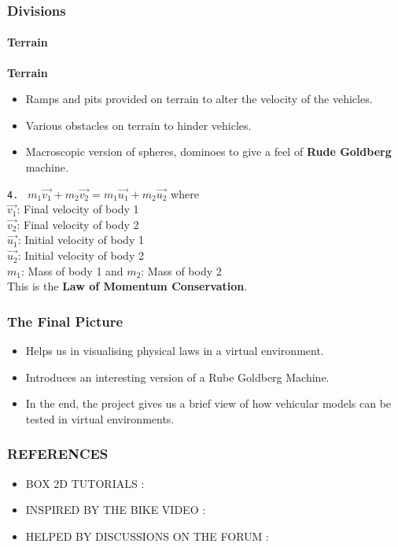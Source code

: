 \begin{frame}
\frametitle{Divisions}
\framesubtitle{Terrain}
  \textbf{Terrain} \pause
  \begin{itemize}
    \item Ramps and pits provided on terrain to alter the velocity of the vehicles. \pause 
    \item Various obstacles on terrain to hinder vehicles. \pause
    \item Macroscopic version of spheres, dominoes to give a feel of \textbf{Rude Goldberg} machine. \pause
  \end{itemize}
 \texttt{4. } $ m_1\overrightarrow{v_1} + m_2\overrightarrow{v_2} = m_1\overrightarrow{u_1} + m_2\overrightarrow{u_2} $ \pause  where \\
  $ \overrightarrow{v_1} $: Final velocity of body 1 \\
  $ \overrightarrow{v_2} $: Final velocity of body 2 \\
  $ \overrightarrow{u_1} $: Initial velocity of body 1 \\
  $ \overrightarrow{u_2} $: Initial velocity of body 2 \\
  $ m_1 $: Mass of body 1 and $ m_2 $: Mass of body 2 \\
  This is the \textbf{Law of Momentum Conservation}.
\end{frame} 

\begin{frame}
\frametitle{The Final Picture}
\begin{itemize}
  \item Helps us in visualising physical laws in a virtual environment. \pause
  \item Introduces an interesting version of a Rube Goldberg Machine. \pause
  \item In the end, the project gives us a brief view of how vehicular models can be tested in virtual environments. \pause 
\end{itemize}
\end{frame}

\begin{frame}
\frametitle{REFERENCES}
\begin{itemize}
  \item BOX 2D TUTORIALS : \cite{link1} 
  \item INSPIRED BY THE BIKE VIDEO : \cite{link2} 
  \item HELPED BY DISCUSSIONS ON THE FORUM : \cite{link3}
\end{itemize}
\end{frame}

{}


